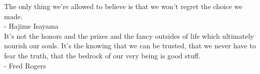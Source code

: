 
\begin{epigrafe}%
 The only thing we're allowed to believe is that we won't regret the choice we made.  \\
- Hajime Isayama
 \\
It's not the honors and the prizes and the fancy outsides of life which ultimately nourish our souls. It's the knowing that we can be trusted, that we never have to fear the truth, that the bedrock of our very being is good stuff.\\
- Fred Rogers
\end{epigrafe}
